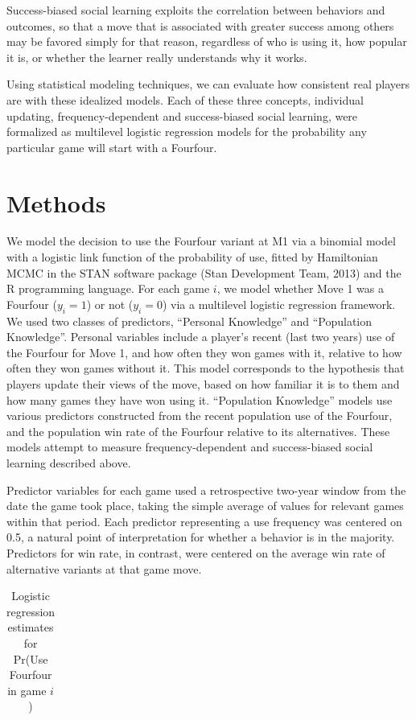 \documentclass{article}
\begin{document}
Success-biased social learning exploits the correlation between behaviors and outcomes, so that a move that is associated with greater success among others may be favored simply for that reason, regardless of who is using it, how popular it is, or whether the learner really understands why it works.

Using statistical modeling techniques, we can evaluate how consistent real players are with these idealized models.  Each of these three concepts, individual updating, frequency-dependent and success-biased social learning, were formalized as multilevel logistic regression models for the probability any particular game will start with a Fourfour.   


\section{Methods}

We model the decision to use the Fourfour variant at M1 via a binomial model with a logistic link function of the probability of use, fitted by Hamiltonian MCMC in the STAN software package (Stan Development Team, 2013) and the R programming language.  For each game $i$, we model whether Move 1 was a Fourfour ($y_i=1$) or not ($y_i=0$) via a multilevel logistic regression framework.  We used two classes of predictors, ``Personal Knowledge'' and ``Population Knowledge''.  Personal variables include a player's recent (last two years) use of the Fourfour for Move 1, and how often they won games with it, relative to how often they won games without it.  This model corresponds to the hypothesis that players update their views of the move, based on how familiar it is to them and how many games they have won using it.  ``Population Knowledge'' models use various predictors constructed from the recent population use of the Fourfour, and the population win rate of the Fourfour relative to its alternatives.  These models attempt to measure frequency-dependent and success-biased social learning described above.

Predictor variables for each game used a retrospective two-year window from the date the game took place, taking the simple average of values for relevant games within that period.  Each predictor representing a use frequency was centered on 0.5, a natural point of interpretation for whether a behavior is in the majority.  Predictors for win rate, in contrast, were centered on the average win rate of alternative variants at that game move.

\begin{table}[tbp]
  \centering
    \begin{tabular}{lrr}
	
    \end{tabular}%
	\caption{Logistic regression estimates for Pr(Use Fourfour in game $i$)}
 \end{table}%
\end{document}

